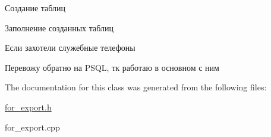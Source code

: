 Создание таблиц

Заполнение созданных таблиц

Если захотели служебные телефоны

Перевожу обратно на P\+S\+QL, тк работаю в основном с ним 

The documentation for this class was generated from the following files\+:\begin{DoxyCompactItemize}
\item 
\mbox{\hyperlink{for__export_8h}{for\+\_\+export.\+h}}\item 
for\+\_\+export.\+cpp\end{DoxyCompactItemize}
